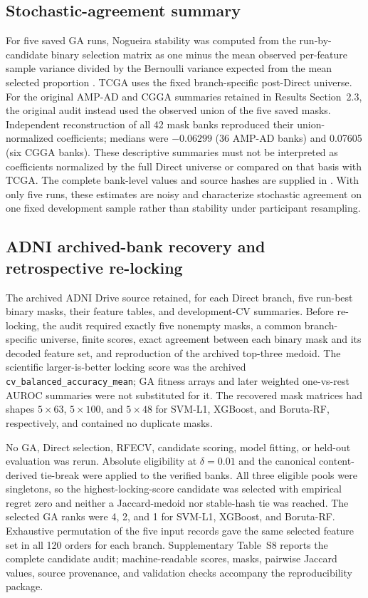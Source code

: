 \subsection{Stochastic-agreement summary}

For five saved GA runs, Nogueira stability was computed from the run-by-candidate binary selection matrix as one minus the mean observed per-feature sample variance divided by the Bernoulli variance expected from the mean selected proportion \citep{ref36}. TCGA uses the fixed branch-specific post-Direct universe. For the original AMP-AD and CGGA summaries retained in Results Section~2.3, the original audit instead used the observed union of the five saved masks. Independent reconstruction of all 42 mask banks reproduced their union-normalized coefficients; medians were $-0.06299$ (36 AMP-AD banks) and 0.07605 (six CGGA banks). These descriptive summaries must not be interpreted as coefficients normalized by the full Direct universe or compared on that basis with TCGA. The complete bank-level values and source hashes are supplied in . With only five runs, these estimates are noisy and characterize stochastic agreement on one fixed development sample rather than stability under participant resampling.



\subsection{ADNI archived-bank recovery and retrospective re-locking}

The archived ADNI Drive source retained, for each Direct branch, five run-best binary masks, their feature tables, and development-CV summaries. Before re-locking, the audit required exactly five nonempty masks, a common branch-specific universe, finite scores, exact agreement between each binary mask and its decoded feature set, and reproduction of the archived top-three medoid. The scientific larger-is-better locking score was the archived \texttt{cv\_balanced\_accuracy\_mean}; GA fitness arrays and later weighted one-vs-rest AUROC summaries were not substituted for it. The recovered mask matrices had shapes $5\times63$, $5\times100$, and $5\times48$ for SVM-L1, XGBoost, and Boruta-RF, respectively, and contained no duplicate masks.

No GA, Direct selection, RFECV, candidate scoring, model fitting, or held-out evaluation was rerun. Absolute eligibility at $\delta=0.01$ and the canonical content-derived tie-break were applied to the verified banks. All three eligible pools were singletons, so the highest-locking-score candidate was selected with empirical regret zero and neither a Jaccard-medoid nor stable-hash tie was reached. The selected GA ranks were 4, 2, and 1 for SVM-L1, XGBoost, and Boruta-RF. Exhaustive permutation of the five input records gave the same selected feature set in all 120 orders for each branch. Supplementary Table~S8 reports the complete candidate audit; machine-readable scores, masks, pairwise Jaccard values, source provenance, and validation checks accompany the reproducibility package.

